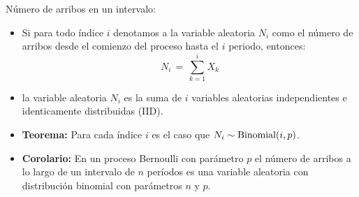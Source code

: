 \documentclass[ 10pt, xcolor = dvipsnames]{beamer}
\begin{document}
\begin{frame}[allowframebreaks]
\frametitle{\insertsection}

N\'umero de arribos en un intervalo: 
\begin{itemize}
\item Si para todo \'indice $i$ denotamos a la variable aleatoria $N_i$ como el n\'umero \linebreak de arribos desde el comienzo del proceso hasta el $i$ periodo, entonces: 
\[
N_i \, = \, \sum_{k=1}^i X_k
\]
\item \Ie la variable aleatoria $N_i$ es la suma de $i$ variables aleatorias independientes e identicamente distribuidas (IID). 
\item \textbf{Teorema:} Para cada \'indice $i$ es el caso que $N_i \sim \text{Binomial}(i,p)$. 
\item \textbf{Corolario:} En un proceso Bernoulli con par\'ametro $p$ el n\'umero de arribos \linebreak a lo largo de un intervalo de $n$ per\'iodos es una variable aleatoria con distribuci\'on binomial con par\'ametros $n$ y $p$. 
\end{itemize}

\end{frame}
\end{document}
